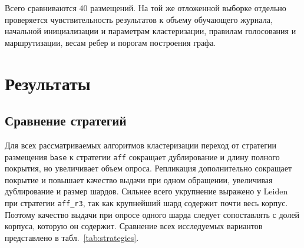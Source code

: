 \documentclass[10pt, a4paper, twoside]{article}
\newcommand{\strategy}[1]{\texttt{#1}}
\begin{document}
\begin{ntvbody}

Всего сравниваются 40 размещений.
На той же отложенной выборке отдельно проверяется чувствительность результатов к объему обучающего журнала, начальной инициализации и параметрам кластеризации, правилам голосования и маршрутизации, весам ребер и порогам построения графа.

\section{Результаты}

\subsection{Сравнение стратегий}
Для всех рассматриваемых алгоритмов кластеризации переход от стратегии размещения \strategy{base} к стратегии \strategy{aff} сокращает дублирование и длину полного покрытия, но увеличивает объем опроса.
Репликация дополнительно сокращает покрытие и повышает качество выдачи при одном обращении, увеличивая дублирование и размер шардов.
Сильнее всего укрупнение выражено у Leiden при стратегии \strategy{aff\_r3}, так как крупнейший шард содержит почти весь корпус.
Поэтому качество выдачи при опросе одного шарда следует сопоставлять с долей корпуса, которую он содержит.
Сравнение всех исследуемых вариантов представлено в табл.~\ref{tab:strategies}.

\end{ntvbody}
\end{document}
